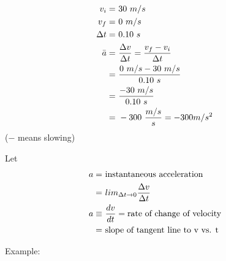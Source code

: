 	\begin{align}
		v_{i} = \ &30 \ m/s& \notag \\
		v_{f} = \ &0 \ m/s& \notag \\
		\Delta t = \ &0.10 \ s& \notag \\
		\bar{a} = \ &\frac{\Delta v}{\Delta t} = \frac{v_{f} - v_{i}}{\Delta t}& \notag \\
		= \ &\frac{0 \ m/s - 30 \ m/s}{0.10 \ s}& \notag \\
		= \ &\frac{- 30 \ m/s}{0.10 \ s}& \notag \\
		= \ &- 300 \ \frac{m/s}{s} = - 300 m/s^{2}& \notag
	\end{align}
	($-$ means slowing) \newline

	Let
	\begin{align}
		a = \ &\text{instantaneous acceleration}& \notag \\
		= \ &lim_{\Delta t \to 0} \frac{\Delta v}{\Delta t}& \notag \\
		a \equiv \ &\frac{dv}{dt} = \text{rate of change of velocity}& \notag \\
		= \ &\text{slope of tangent line to v vs. t}& \notag
	\end{align}

	Example:

